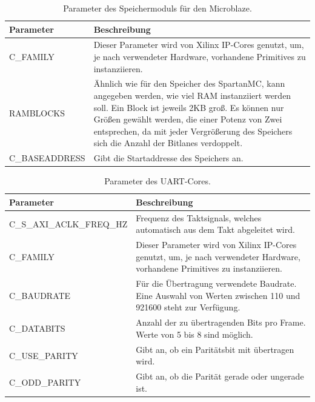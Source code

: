 \begin{table}[ht!]
	\begin{tabular}{|l|p{10cm}|}
		\hline \textbf{Parameter} & \textbf{Beschreibung} \\ 
		\hline C\_FAMILY & Dieser Parameter wird von Xilinx IP-Cores genutzt, um, je nach verwendeter Hardware, vorhandene Primitives zu instanziieren. \\ 
		\hline RAMBLOCKS & Ähnlich wie für den Speicher des SpartanMC, kann angegeben werden, wie viel RAM instanziiert werden soll. Ein Block ist jeweils 2KB groß. Es können nur Größen gewählt werden, die einer Potenz von Zwei entsprechen, da mit jeder Vergrößerung des Speichers sich die Anzahl der Bitlanes verdoppelt.\\ 
		\hline C\_BASEADDRESS & Gibt die Startaddresse des Speichers an.\\ 
		\hline 
	\end{tabular}
	\centering
	\caption{Parameter des Speichermoduls für den Microblaze.}
	\label{tab:MemParam}
\end{table}

\begin{table}[ht!]
	\begin{tabular}{|l|p{10cm}|}
		\hline \textbf{Parameter} & \textbf{Beschreibung} \\ 
		\hline C\_S\_AXI\_ACLK\_FREQ\_HZ & Frequenz des Taktsignals, welches automatisch aus dem Takt abgeleitet wird.\\ 
		\hline C\_FAMILY & Dieser Parameter wird von Xilinx IP-Cores genutzt, um, je nach verwendeter Hardware, vorhandene Primitives zu instanziieren.\\ 
		\hline C\_BAUDRATE & Für die Übertragung verwendete Baudrate. Eine Auswahl von Werten zwischen 110 und 921600 steht zur Verfügung. \\ 
		\hline C\_DATABITS & Anzahl der zu übertragenden Bits pro Frame. Werte von 5 bis 8 sind möglich. \\ 
		\hline C\_USE\_PARITY & Gibt an, ob ein Paritätsbit mit übertragen wird. \\ 
		\hline C\_ODD\_PARITY & Gibt an, ob die Parität gerade oder ungerade ist. \\ 
		\hline 
	\end{tabular}
	\centering
	\caption{Parameter des UART-Cores.}
	\label{tab:UARTParam}
\end{table}

